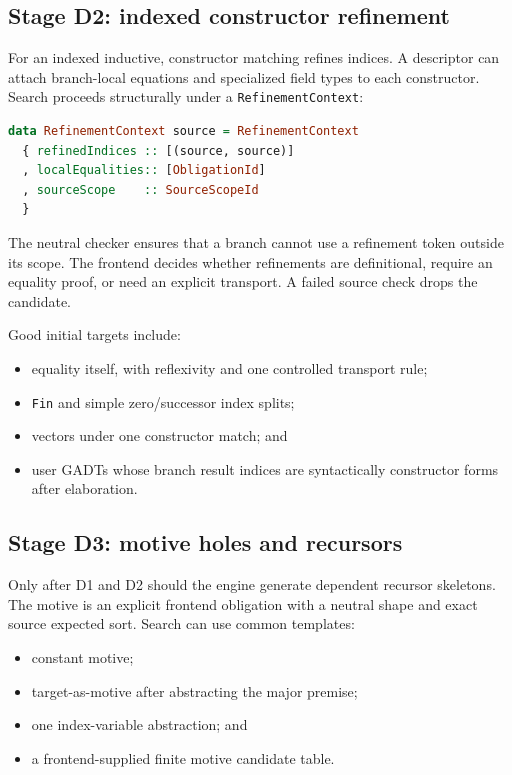 \documentclass[11pt]{article}
\newcommand{\code}[1]{\texttt{#1}}
\begin{document}
\subsection{Stage D2: indexed constructor refinement}

For an indexed inductive, constructor matching refines indices.  A descriptor
can attach branch-local equations and specialized field types to each
constructor.  Search proceeds structurally under a \code{RefinementContext}:

\begin{lstlisting}[language=Haskell]
data RefinementContext source = RefinementContext
  { refinedIndices :: [(source, source)]
  , localEqualities:: [ObligationId]
  , sourceScope    :: SourceScopeId
  }
\end{lstlisting}

The neutral checker ensures that a branch cannot use a refinement token outside
its scope.  The frontend decides whether refinements are definitional, require
an equality proof, or need an explicit transport.  A failed source check drops
the candidate.

Good initial targets include:

\begin{itemize}
  \item equality itself, with reflexivity and one controlled transport rule;
  \item \code{Fin} and simple zero/successor index splits;
  \item vectors under one constructor match; and
  \item user GADTs whose branch result indices are syntactically constructor
    forms after elaboration.
\end{itemize}

\subsection{Stage D3: motive holes and recursors}

Only after D1 and D2 should the engine generate dependent recursor skeletons.
The motive is an explicit frontend obligation with a neutral shape and exact
source expected sort.  Search can use common templates:

\begin{itemize}
  \item constant motive;
  \item target-as-motive after abstracting the major premise;
  \item one index-variable abstraction; and
  \item a frontend-supplied finite motive candidate table.
\end{itemize}
\end{document}
